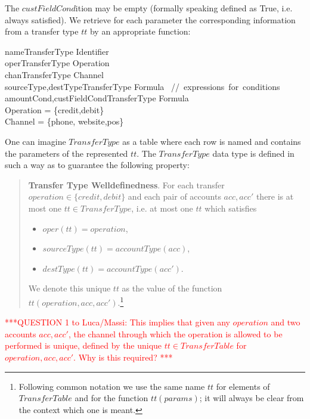 The $custFieldCond$ition may be empty (formally speaking defined as True, i.e. always satisfied). We retrieve for each parameter the corresponding information from a transfer type $tt$ by an appropriate function:

\begin{asm}
name\colon TransferType \rightarrow Identifier \\
oper\colon TransferType \rightarrow Operation\\
chan\colon TransferType \rightarrow Channel \\
sourceType,destType\colon TransferType \rightarrow Formula 
       \mbox{ // expressions for conditions}\\
amountCond,custFieldCond\colon TransferType \rightarrow Formula\\
\WHERE \+
    Operation = \{credit,debit\} \\
    Channel = \{phone, website,pos\}
\end{asm} 

One can imagine $TransferType$ as a table where each row is named and contains the parameters of the represented $tt$. The $TransferType$ data type is defined in such a way as to guarantee the following property: 
\begin{quote} 
	{\bf Transfer Type Welldefinedness}. For each transfer $operation \in \{credit,debit\}$ and each pair of accounts $acc,acc'$ there is at most one $tt \in TransferType$, i.e. at most one $tt$ which satisfies
	\begin{itemize}
		\item $oper(tt) = operation$,
		\item $sourceType(tt)=accountType(acc)$,
		\item $destType(tt)=accountType(acc')$.
	\end{itemize} 
We denote this unique $tt$ as the value of the function $tt(operation,acc,acc')$.\footnote{Following common notation we use the same name $tt$ for elements of $TransferTable$ and for the function $tt(params)$; it will always be clear from the context which one is meant.}
\end{quote}

\vspace{12pt}
\textcolor{red}{***QUESTION 1 to Luca/Massi: This implies that given any $operation$ and two accounts $acc,acc'$, the channel through which the operation is allowed to be performed is unique, defined by the unique $tt \in TransferTable$ for $operation,acc,acc'$. Why is this required? ***}
\vspace{12pt}

